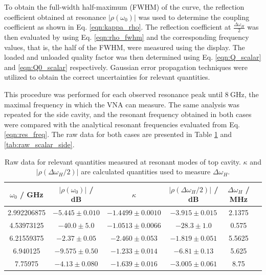 \documentclass[a4paper]{report}
\numberwithin{equation}{section}
\begin{document}
To obtain the full-width half-maximum (FWHM) of the curve, the reflection
coefficient obtained at resonance $|\rho(\omega_0)|$ was used to determine the
coupling coefficient as shown in Eq. \ref{eqn:kappa_rho}. The reflection
coefficient at $\frac{\Delta\omega_H}{2}$ was then evaluated by using Eq.
\ref{eqn:rho_fwhm} and the corresponding frequency values, that is, the half of the FWHM, were measured using
the display. The loaded and unloaded quality factor was then determined using Eq. \ref{eqn:Q_scalar} and
\ref{eqn:Q0_scalar} respectively. Gaussian error propagation techniques were
utilized to obtain the correct uncertainties for relevant quantities. \par 


This procedure was performed for each observed resonance peak until $\SI{8}{\giga\hertz}$, the
maximal frequency in which the VNA can measure. The same analysis was repeated
for the side cavity, and the resonant frequency obtained in both cases were
compared with the analytical resonant frequencies evaluated from Eq. \ref{eqn:res_freq}. The raw data
for both cases are presented in Table \ref{tab:raw_scalar_top} and \ref{tab:raw_scalar_side}. 

\begin{table}[htb!]
	\centering
	\begin{tabular}{|c|c|c|c|c|c|}
		\hline $\omega_0$ / GHz & $\left| \rho(\omega_0) \right|$ / dB & $\kappa$ & $\left| \rho(\Delta\omega_H / 2) \right|$ / dB & $\Delta\omega_H$ / MHz\\ 
		\hline 2.992206875 & $-5.445 \pm 0.010$ & $-1.4499 \pm 0.0010$ & $-3.915 \pm 0.015$ & 2.1375 \\ 
		\hline 4.53973125 & $-40.0 \pm 5.0$ & $-1.0513 \pm 0.0066$ & $-28.3 \pm 1.0$ & 0.575 \\
		\hline 6.21559375 & $-2.37 \pm 0.05$ & $ -2.460 \pm 0.053$ & $-1.819 \pm 0.051$ & 5.5625 \\
		\hline 6.940125 & $-9.575 \pm 0.50$ & $-1.233 \pm 0.014$ & $-6.81 \pm 0.13$ & 5.625 \\ 
		\hline 7.75975 & $-4.13 \pm 0.080$ & $-1.639 \pm 0.016$ & $-3.005 \pm 0.061$ & 8.75 \\ 
		\hline
	\end{tabular}
	
	\caption{Raw data for relevant quantities measured at resonant modes of top cavity. $\kappa$ and $\left| \rho(\Delta\omega_H / 2) \right|$ 
			are calculated quantities used to measure $\Delta\omega_H$. }
	\label{tab:raw_scalar_top}
\end{table}
\end{document}
